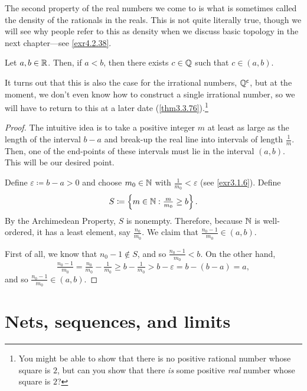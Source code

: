 The second property of the real numbers we come to is what is sometimes called the density of the rationals in the reals.  This is not quite literally true, though we will see why people refer to this as density when we discuss basic topology in the next chapter---see \cref{exr4.2.38}.
\begin{thm}[`Density' of $\Q$ in $\R$]\label{thm3.2.14}
Let $a,b\in \mathbb{R}$.  Then, if $a<b$, then there exists $c\in \mathbb{Q}$ such that $c\in (a,b)$.
\begin{rmk}
It turns out that this is also the case for the irrational numbers, $\mathbb{Q} ^{\mathsf{c}}$, but at the moment, we don't even know how to construct a single irrational number, so we will have to return to this at a later date (\cref{thm3.3.76}).\footnote{You might be able to show that there is no positive rational number whose square is $2$, but can you show that there \emph{is} some positive \emph{real} number whose square is $2$?}
\end{rmk}
\begin{proof}
The intuitive idea is to take a positive integer $m$ at least as large as the length of the interval $b-a$ and break-up the real line into intervals of length $\frac{1}{m}$.  Then, one of the end-points of these intervals must lie in the interval $(a,b)$.  This will be our desired point.

Define $\varepsilon \coloneqq b-a>0$ and choose $m_0\in \mathbb{N}$ with $\frac{1}{m_0}<\varepsilon$ (see \cref{exr3.1.6}).  Define
\begin{equation}
S\coloneqq \left\{ m\in \mathbb{N} :\tfrac{m}{m_0}\geq b\right\} .
\end{equation}
By the Archimedean Property, $S$ is nonempty.  Therefore, because $\mathbb{N}$ is well-ordered, it has a least element, say $\frac{n_0}{m_0}$.  We claim that $\frac{n_0-1}{m_0}\in (a,b)$.

First of all, we know that $n_0-1\notin S$, and so $\frac{n_0-1}{m_0}<b$.  On the other hand,
\begin{equation}
\tfrac{n_0-1}{m_0}=\tfrac{n_0}{m_0}-\tfrac{1}{m_0}\geq b-\tfrac{1}{m_0}>b-\varepsilon =b-(b-a)=a,
\end{equation}
and so $\frac{n_0-1}{m_0}\in (a,b)$.
\end{proof}
\end{thm}

\section{Nets, sequences, and limits}

